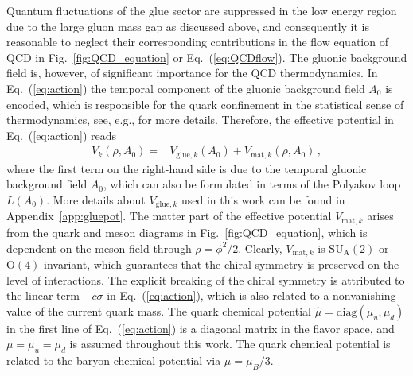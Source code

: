 \documentclass[%
reprint,
superscriptaddress,
showpacs,preprintnumbers,
 amsmath,amssymb,
 aps,
prd,
]{revtex4-1}
\def\Fig#1{Fig.~\ref{#1}} \def\Tab#1{Tab.~\ref{#1}}
\def\Eq#1{Eq.~(\ref{#1})}
\def\app#1{Appendix~\ref{#1}}
\begin{document}
Quantum fluctuations of the glue sector are suppressed in the low energy region due to the large gluon mass gap as discussed above, and consequently it is reasonable to neglect their corresponding contributions in the flow equation of QCD in \Fig{fig:QCD_equation} or \Eq{eq:QCDflow}. The gluonic background field is, however, of significant importance for the QCD thermodynamics. In \Eq{eq:action} the temporal component of the gluonic background field $A_0$ is encoded, which is responsible for the quark confinement in the statistical sense of thermodynamics, see, e.g., \cite{Fukushima:2003fw,Ratti:2005jh,Schaefer:2007pw,Fu:2007xc} for more details. Therefore, the effective potential in \Eq{eq:action} reads
%
\begin{align}
V_k(\rho,A_0)=&V_{\mathrm{glue},k}(A_0)+V_{\mathrm{mat},k}(\rho,A_0)\,,\label{eq:Vtotal}
\end{align}
%
where the first term on the right-hand side is due to the temporal gluonic background field $A_0$, which can also be formulated in terms of the Polyakov loop $L(A_0)$. More details about $V_{\mathrm{glue},k}$ used in this work can be found in \app{app:gluepot}. The matter part of the effective potential $V_{\mathrm{mat},k}$ arises from the quark and meson diagrams in \Fig{fig:QCD_equation}, which is dependent on the meson field through $\rho=\phi^2/2$. Clearly,   $V_{\mathrm{mat},k}$ is $\mathrm{SU_A}(2)$ or $\mathrm{O}(4)$ invariant, which guarantees that the chiral symmetry is preserved on the level of interactions. The explicit breaking of the chiral symmetry is attributed to the linear term $-c\sigma$ in \Eq{eq:action}, which is also related to a nonvanishing value of the current quark mass. The quark chemical potential $\hat\mu=\mathrm{diag}(\mu_u,\mu_d)$ in the first line of \Eq{eq:action} is a diagonal matrix in the flavor space, and $\mu=\mu_u=\mu_d$ is assumed throughout this work. The quark chemical potential is related to the baryon chemical potential via $\mu=\mu_B/3$.
\end{document}
